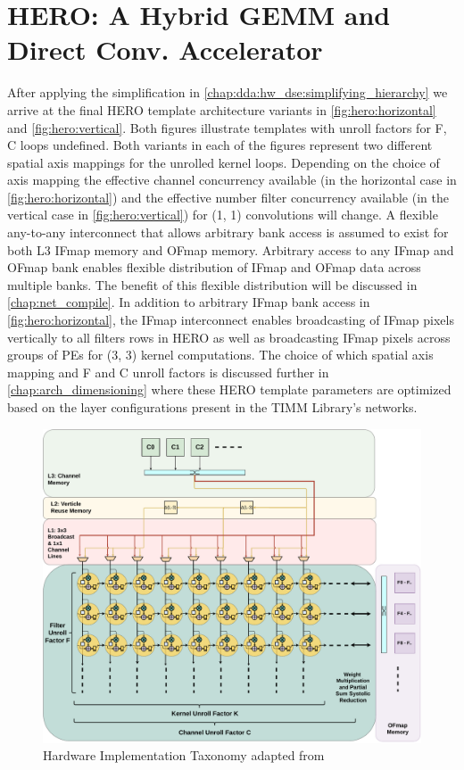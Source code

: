 \section{HERO: A Hybrid GEMM and Direct Conv. Accelerator}
\label{chap:dda:hw_dse:final}

After applying the simplification in
\autoref{chap:dda:hw_dse:simplifying_hierarchy} we arrive at the final HERO
template architecture variants in \autoref{fig:hero:horizontal} and
\autoref{fig:hero:vertical}. Both figures illustrate templates with unroll
factors for F, C loops undefined. Both variants in each of the figures represent
two different spatial axis mappings for the unrolled kernel loops. Depending on
the choice of axis mapping the effective channel concurrency available (in the
horizontal case in \autoref{fig:hero:horizontal}) and the effective number
filter concurrency available (in the vertical case in
\autoref{fig:hero:vertical}) for (1, 1) convolutions will change. A flexible
any-to-any interconnect that allows arbitrary bank access is assumed to exist for
both L3 IFmap memory and OFmap memory. Arbitrary access to any IFmap and OFmap
bank enables flexible distribution of IFmap and OFmap data across multiple
banks. The benefit of this flexible distribution will be discussed in
\autoref{chap:net_compile}. In addition to arbitrary IFmap bank access in
\autoref{fig:hero:horizontal}, the IFmap interconnect enables broadcasting of
IFmap pixels vertically to all filters rows in HERO as well as broadcasting
IFmap pixels across groups of PEs for (3, 3) kernel computations. The choice of
which spatial axis mapping and F and C unroll factors is discussed further in
\autoref{chap:arch_dimensioning} where these HERO template parameters are
optimized based on the layer configurations present in the TIMM Library's
networks.   

\begin{figure}[ht]
    \centering
    \includegraphics[scale=0.58]{fig/hero-t-horizontal.pdf}
    \caption{Hardware Implementation Taxonomy adapted from \cite{maestro}}
    \label{fig:hero:horizontal}
\end{figure}

